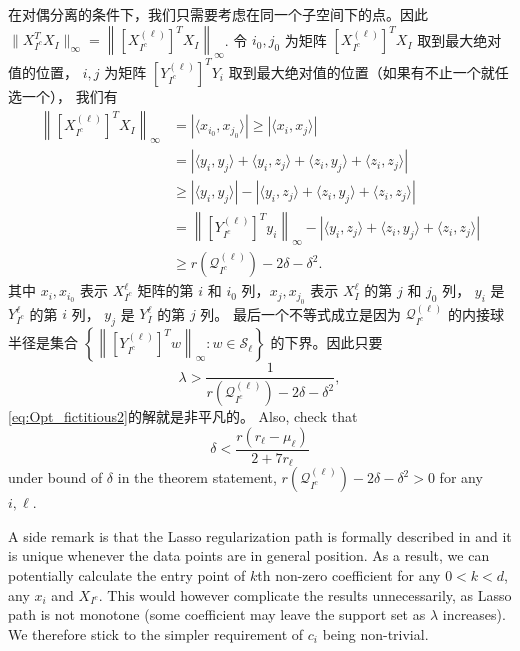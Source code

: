 \documentclass[main.tex]{subfiles}
\begin{document}
在对偶分离的条件下，我们只需要考虑在同一个子空间下的点。因此 $\|X_{I^c}^T X_I\|_{\infty} = 
\left\|[X_{I^c}^{(\ell)}]^T X_I\right\|_{\infty}$. 令 $i_0, j_0$ 为矩阵
$[X_{I^c}^{(\ell)}]^T X_I$ 取到最大绝对值的位置， $i,j$ 为矩阵
$[Y_{I^c}^{(\ell)}]^T Y_i$ 取到最大绝对值的位置（如果有不止一个就任选一个），
我们有
\begin{align}
  \left\|[X_{I^c}^{(\ell)}]^TX_I\right\|_{\infty}&=\left|\langle x_{i_0},
  x_{j_0}\rangle\right|  \geq \left|\langle x_i, x_j\rangle\right|\nonumber\\
  &= \left|\langle y_i, y_j\rangle  + \langle y_i, z_j\rangle + \langle z_i, y_j\rangle + \langle z_i, z_j\rangle\right|\nonumber\\
  &\geq \left|\langle y_i, y_j\rangle\right| - \left|\langle y_i, z_j\rangle + \langle z_i, y_j\rangle + \langle z_i, z_j\rangle\right|\nonumber\\
  & = \left\|[Y_{I^c}^{(\ell)}]^Ty_i\right\|_{\infty} - \left|\langle y_i, z_j\rangle + \langle z_i, y_j\rangle + \langle z_i, z_j\rangle\right|\nonumber\\
  &\geq r(\mathcal{Q}^{(\ell)}_{I^c}) - 2\delta - \delta^2. \label{eq:lowerbounding_max_affinity}
\end{align}
其中 $x_i, x_{i_0}$ 表示 $X_{I^c}^{\ell}$ 矩阵的第 $i$ 和 $i_0$ 列，$x_j,
x_{j_0}$ 表示 $X_I^{\ell}$ 的第 $j$ 和 $j_0$ 列， $y_i$ 是 $Y_{I^c}^{\ell}$
的第 $i$ 列， $y_j$ 是 $Y_I^{\ell}$ 的第 $j$ 列。 最后一个不等式成立是因为 $\mathcal{Q}^{(\ell)}_{I^c}$ 
的内接球半径是集合 $\left\{\left\| [ Y_{I^c}^{(\ell)}]^T w\right\|_\infty: w
\in  \mathcal{S}_{\ell}\right\} $ 的下界。因此只要
\begin{equation}\label{eq:lambda_low}
  \lambda > \frac{1}{ r(\mathcal{Q}^{(\ell)}_{I^c}) - 2\delta - \delta^2},
\end{equation}
\eqref{eq:Opt_fictitious2}的解就是非平凡的。 Also, check that
\begin{equation}\label{eq:deterministic_delta}
\delta<\frac{r(r_\ell - \mu_\ell)}{2+7r_\ell}
\end{equation}
under bound of $\delta$ in the theorem statement,  $r(\mathcal{Q}^{(\ell)}_{I^c}) - 2\delta - \delta^2>0$ for any $i,\ell$.

A side remark is that the Lasso regularization path is formally described in \cite{tibshirani2013lasso} and it is unique whenever the data points are in general position. As a result, we can potentially calculate the entry point of $k$th non-zero coefficient for any $0<k<d$, any $x_i$ and $X_{I^c}$. This would however complicate the results unnecessarily, as Lasso path is not monotone (some coefficient may leave the support set as $\lambda$ increases). We therefore stick to the simpler requirement of $c_i$ being non-trivial.
\end{document}
